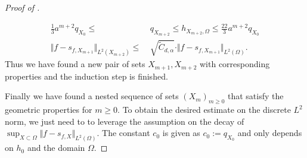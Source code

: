 \documentclass[a4paper, 10pt]{article}
\begin{document}
\begin{proof}[Proof of ]
\begin{enumerate}
\begin{align*}
\frac{1}{3} a^{m+2} q_{X_0} \leq& ~ q_{X_{m+2}} \leq h_{X_{m+2}, \Omega} \leq \frac{22}{3} a^{m+2} q_{X_0} \\
\Vert f - s_{f, X_{m+1}} \Vert_{L^2(X_{m+2})} \leq& ~ \sqrt{\tilde{C}_{d, \alpha}} \cdot \Vert f - s_{f, X_{m+1}} \Vert_{L^2(\Omega)}. 
\end{align*}
Thus we have found a new pair of sets $X_{m+1}, X_{m+2}$ with corresponding properties and the induction step is finished.
\end{enumerate}
Finally we have found a nested sequence of sets $(X_m)_{m \geq 0}$ that satisfy the geometric properties for $m \geq 0$.
To obtain the desired estimate on the discrete $L^2$ norm, we just need to to leverage the assumption on the decay of $\sup_{X \subset \Omega} \Vert f - s_{f, X} \Vert_{L^2(\Omega)}$.
The constant $c_0$ is given as $c_0 := q_{X_0}$ and only depends on $h_0$ and the domain $\Omega$.
\end{proof}
\end{document}
